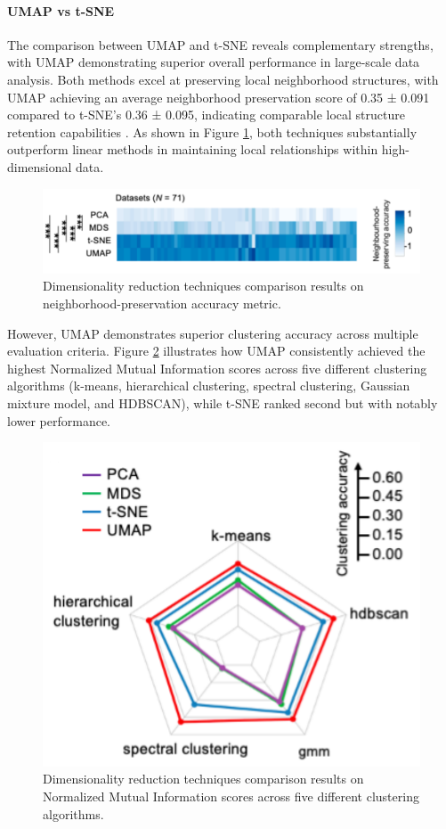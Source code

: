 \paragraph{UMAP vs t-SNE}
The comparison between UMAP and t-SNE reveals complementary strengths, with UMAP demonstrating superior overall performance in large-scale data analysis. Both methods excel at preserving local neighborhood structures, with UMAP achieving an average neighborhood preservation score of 0.35 ± 0.091 compared to t-SNE's 0.36 ± 0.095, indicating comparable local structure retention capabilities \cite{yang2021dimensionality}. As shown in Figure \ref{fig:DRcomparison2}, both techniques substantially outperform linear methods in maintaining local relationships within high-dimensional data.

\begin{figure}
    \centering
    \includegraphics[width=\linewidth]{images/DRcomparison2.png}
    \caption{Dimensionality reduction techniques comparison results on neighborhood-preservation accuracy metric.}
    \label{fig:DRcomparison2}
\end{figure}

However, UMAP demonstrates superior clustering accuracy across multiple evaluation criteria. Figure \ref{fig:DRcomparison3} illustrates how UMAP consistently achieved the highest Normalized Mutual Information scores across five different clustering algorithms (k-means, hierarchical clustering, spectral clustering, Gaussian mixture model, and HDBSCAN), while t-SNE ranked second but with notably lower performance. 

\begin{figure}
    \centering
    \includegraphics[width=0.7\linewidth]{images/DRcomparison3.png}
    \caption{Dimensionality reduction techniques comparison results on Normalized Mutual Information scores across five different clustering algorithms.}
    \label{fig:DRcomparison3}
\end{figure}


